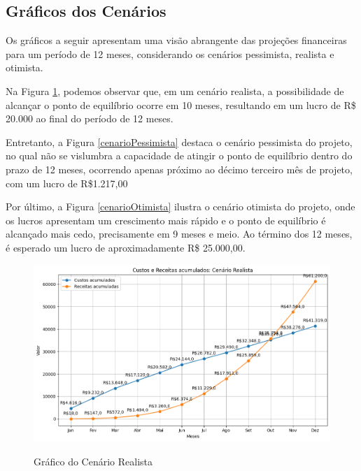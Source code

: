 \subsection{Gráficos dos Cenários}

Os gráficos a seguir apresentam uma visão abrangente das projeções financeiras para um período de 12 meses, considerando os cenários pessimista, realista e otimista.

Na Figura \ref{cenarioRealista}, podemos observar que, em um cenário realista, a possibilidade de alcançar o ponto de equilíbrio ocorre em 10 meses, resultando em um lucro de R\$ 20.000 ao final do período de 12 meses.

Entretanto, a Figura \ref{cenarioPessimista} destaca o cenário pessimista do projeto, no qual não se vislumbra a capacidade de atingir o ponto de equilíbrio dentro do prazo de 12 meses, ocorrendo apenas próximo ao décimo terceiro mês de projeto, com um lucro de R\$1.217,00

Por último, a Figura \ref{cenarioOtimista} ilustra o cenário otimista do projeto, onde os lucros apresentam um crescimento mais rápido e o ponto de equilíbrio é alcançado mais cedo, precisamente em 9 meses e meio. Ao término dos 12 meses, é esperado um lucro de aproximadamente R\$ 25.000,00.

\begin{figure}[H]
    \center
	\caption{\label{fig_sge20}Gráfico do Cenário Realista}
    \includegraphics[scale=0.60]{imagens/viabilidadeFinanceira/Projeção-Receita_Custos-Realista.png}
    \label{cenarioRealista}
\end{figure}

